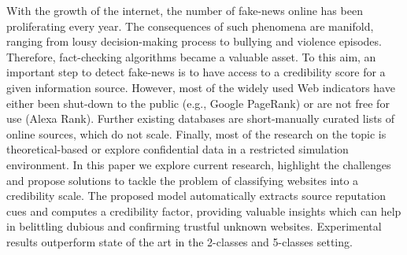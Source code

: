 With the growth of the internet, the number of fake-news online has been proliferating every year. The consequences of such phenomena are manifold, ranging from lousy decision-making process to bullying and violence episodes. Therefore, fact-checking algorithms became a valuable asset. To this aim, an important step to detect fake-news is to have access to a credibility score for a given information source. However, most of the widely used Web indicators have either been shut-down to the public (e.g., Google PageRank) or are not free for use (Alexa Rank). Further existing databases are short-manually curated lists of online sources, which do not scale. Finally, most of the research on the topic is theoretical-based or explore confidential data in a restricted simulation environment. In this paper we explore current research, highlight the challenges and propose solutions to tackle the problem of classifying websites into a credibility scale. The proposed model automatically extracts source reputation cues and computes a credibility factor, providing valuable insights which can help in belittling dubious and confirming trustful unknown websites. Experimental results outperform state of the art in the 2-classes and 5-classes setting.
